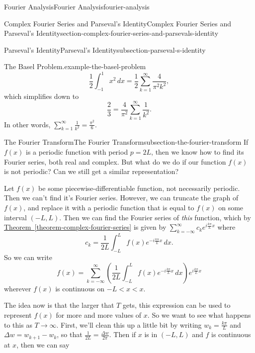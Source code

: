\documentclass[oneside,10pt,]{book}
\numberwithin{equation}{section}
\newcommand{\lt}{<}
\begin{document}
\begin{chapterptx}{Fourier Analysis}{}{Fourier Analysis}{}{}{fourier-analysis}
\begin{sectionptx}{Complex Fourier Series and Parseval's Identity}{}{Complex Fourier Series and Parseval's Identity}{}{}{section-complex-fourier-series-and-parsevals-identity}
\begin{subsectionptx}{Parseval's Identity}{}{Parseval's Identity}{}{}{subsection-parseval-s-identity}
\begin{example}{The Basel Problem.}{example-the-basel-problem}
\begin{equation*}
\frac{1}{2}\int_{-1}^{1}x^{2}\,dx = \frac{1}{2}\sum_{k=1}^{\infty}\frac{4}{\pi^{2}k^{2}},
\end{equation*}
which simplifies down to%
\begin{equation*}
\frac{2}{3} = \frac{4}{\pi^{2}}\sum_{k=1}^{\infty}\frac{1}{k^{2}}.
\end{equation*}
In other words, \(\sum_{k=1}^{\infty}\frac{1}{k^{2}} = \frac{\pi^{2}}{6}.\)%
\end{example}
%
\end{subsectionptx}
\end{sectionptx}
%
%
\typeout{************************************************}
\typeout{************************************************}
%
\begin{sectionptx}{The Fourier Transform}{}{The Fourier Transform}{}{}{subsection-the-fourier-transform}
\hypertarget{p-613}{}%
If \(f(x)\) is a periodic function with period \(p=2L\), then we know how to find its Fourier series, both real and complex. But what do we do if our function \(f(x)\) is not periodic? Can we still get a similar representation?%
\par
\hypertarget{p-614}{}%
Let \(f(x)\) be some piecewise-differentiable function, not necessarily periodic. Then we can't find it's Fourier series. However, we can truncate the graph of \(f(x)\), and replace it with a periodic function that is equal to \(f(x)\) on some interval \((-L,L)\). Then we can find the Fourier series of \emph{this} function, which by \hyperref[theorem-complex-fourier-series]{Theorem~\ref{theorem-complex-fourier-series}} is given by \(\sum_{k=-\infty}^{\infty}c_{k}e^{i\frac{k\pi}{L}x}\) where%
\begin{equation*}
c_{k} = \frac{1}{2L}\int_{-L}^{L}f(x)e^{-i\frac{k\pi}{L}x}\,dx.
\end{equation*}
So we can write%
\begin{equation*}
f(x) = \sum_{k=-\infty}^{\infty}\left(\frac{1}{2L}\int_{-L}^{L}f(x)e^{-i\frac{k\pi}{L}x}\,dx\right)e^{i\frac{k\pi}{L}x}
\end{equation*}
wherever \(f(x)\) is continuous on \(-L \lt x \lt x\).%
\par
\hypertarget{p-615}{}%
The idea now is that the larger that \(T\) gets, this expression can be used to represent \(f(x)\) for more and more values of \(x\). So we want to see what happens to this as \(T\to\infty\). First, we'll clean this up a little bit by writing \(w_{k} = \frac{k\pi}{L}\) and \(\Delta w = w_{k+1} - w_{k}\), so that \(\frac{1}{2L} = \frac{\Delta w}{2\pi}\). Then if \(x\) is in \((-L,L)\) and \(f\) is continuous at \(x\), then we can say%

\end{sectionptx}
\end{chapterptx}
\end{document}
